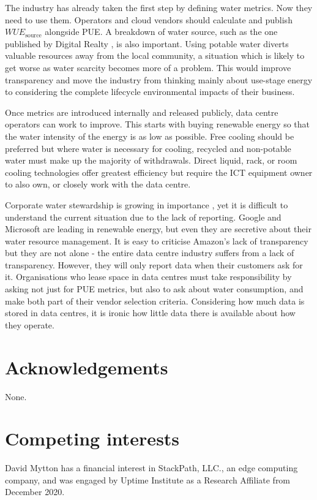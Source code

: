\documentclass{article}
\begin{document}
The industry has already taken the first step by defining water metrics. Now
they need to use them. Operators and cloud vendors should calculate and publish
$WUE_\textrm{source}$ alongside PUE. A breakdown of water source, such as the
one published by Digital Realty \cite{digital_realty_environmental_2019}, is
also important. Using potable water diverts valuable resources away from the
local community, a situation which is likely to get worse as water scarcity
becomes more of a problem. This would improve transparency and move the
industry from thinking mainly about use-stage energy to considering the
complete lifecycle environmental impacts of their business.

Once metrics are introduced internally and released publicly, data centre
operators can work to improve. This starts with buying renewable energy so that
the water intensity of the energy is as low as possible. Free cooling should be
preferred but where water is necessary for cooling, recycled and non-potable
water must make up the majority of withdrawals. Direct liquid, rack, or room
cooling technologies offer greatest efficiency but require the ICT equipment
owner to also own, or closely work with the data centre.

Corporate water stewardship is growing in importance \cite{yu_drivers_2020},
yet it is difficult to understand the current situation due to the lack of
reporting. Google and Microsoft are leading in renewable energy, but even they
are secretive about their water resource management. It is easy to criticise
Amazon's lack of transparency but they are not alone - the entire data centre
industry suffers from a lack of transparency. However, they will only report
data when their customers ask for it. Organisations who lease space in data
centres must take responsibility by asking not just for PUE metrics, but also
to ask about water consumption, and make both part of their vendor selection
criteria. Considering how much data is stored in data centres, it is ironic how
little data there is available about how they operate.

\section*{Acknowledgements} None.

\section*{Competing interests} David Mytton has a financial interest in
StackPath, LLC., an edge computing company, and was engaged by Uptime Institute
as a Research Affiliate from December 2020.
\end{document}
